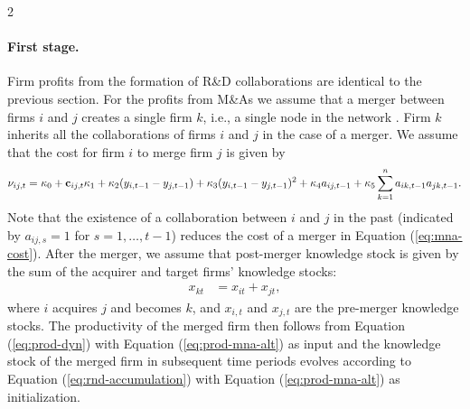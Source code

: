 \documentclass[12pt]{article}
\begin{document}
\begin{spacing}{2}
\paragraph{First stage.} Firm profits from the formation of R\&D collaborations are identical to the previous section. For the profits from M\&As we assume that a merger between firms $i$ and $j$ creates a single firm $k$, i.e., a single node in the network \citep{phillips2013r,Bimpikis2019}. %
Firm $k$ inherits all the collaborations of firms $i$ and $j$ in the case of a merger. We assume that the cost for firm $i$ to merge firm $j$ is given by
\begin{equation}
\nu_{ij,t}
= 
\phantom{\sum_k} \hspace{-0.5cm}
\kappa_0
+ 
\mathbf{c}_{ij,t} \kappa_1
+
\kappa_2 (y_{i,t-1}-y_{j,t-1})
+
\kappa_3 (y_{i,t-1}-y_{j,t-1})^2
+
\kappa_{4} a_{ij,t-1}
+
\kappa_{5} \sum_{k=1}^n a_{ik,t-1} a_{jk,t-1}.
\label{eq:mna-cost}
\end{equation}
Note that the existence of a collaboration between $i$ and $j$ in the past (indicated by $a_{ij,s}=1$ for $s=1,\ldots,t-1$) reduces the cost of a merger in Equation (\ref{eq:mna-cost}). After the merger, we assume that post-merger knowledge stock is given by the sum of the acquirer and target firms' knowledge stocks:
\begin{align}
x_{kt}  
&= 
x_{it} + x_{jt}, 
\label{eq:prod-mna-alt}
\end{align}
where $i$ acquires $j$ and becomes $k$, and $x_{i,t}$ and $x_{j,t}$ are the pre-merger knowledge stocks. The productivity of the merged firm then follows from Equation (\ref{eq:prod-dyn}) with Equation (\ref{eq:prod-mna-alt}) as input and the knowledge stock of the merged firm in subsequent time periods evolves according to Equation (\ref{eq:rnd-accumulation}) with Equation (\ref{eq:prod-mna-alt}) as initialization.


\end{spacing}
\end{document}
